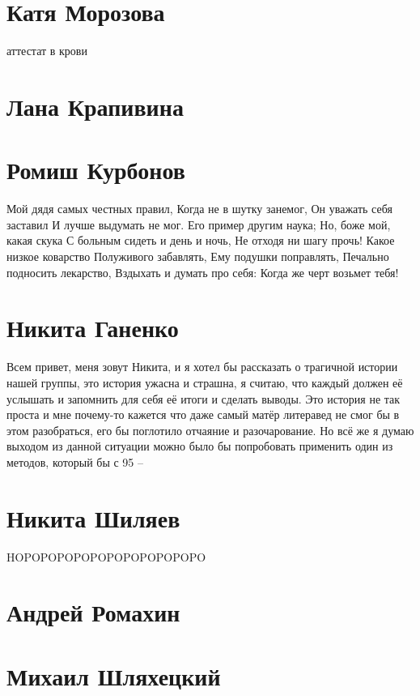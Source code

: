 \documentclass{article}
\begin{document}
\section*{Катя Морозова}
аттестат в крови

\section*{Лана Крапивина}

\section*{Ромиш Курбонов}

Мой дядя самых честных правил, Когда не в шутку занемог, Он уважать себя заставил И лучше выдумать не мог.
Его пример другим наука; Но, боже мой, какая скука С больным сидеть и день и ночь, Не отходя ни шагу прочь!
Какое низкое коварство Полуживого забавлять, Ему подушки поправлять, Печально подносить лекарство,
Вздыхать и думать про себя: Когда же черт возьмет тебя!

\section*{Никита Ганенко}

Всем привет, меня зовут Никита, и я хотел бы рассказать о трагичной истории нашей группы, это история ужасна и страшна, я считаю, что каждый должен её услышать и запомнить для себя её итоги и сделать выводы. Это история не так проста и мне почему-то кажется что даже самый матёр литеравед не смог бы в этом разобраться, его бы поглотило отчаяние и разочарование. Но всё же я думаю выходом из данной ситуации можно было бы попробовать применить один из методов, который бы с 95%
--
\section*{Никита Шиляев}

HOPOPOPOPOPOPOPOPOPOPOPO

\section*{Андрей Ромахин}

\section*{Михаил Шляхецкий}
\end{document}
